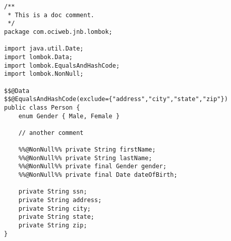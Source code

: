 \begin{lstlisting}[caption= Exemplo de Código em Java, label=src:java]
/**
 * This is a doc comment.
 */
package com.ociweb.jnb.lombok;

import java.util.Date;
import lombok.Data;
import lombok.EqualsAndHashCode;
import lombok.NonNull;

$$@Data
$$@EqualsAndHashCode(exclude={"address","city","state","zip"})
public class Person {
    enum Gender { Male, Female }

    // another comment

    %%@NonNull%% private String firstName;
    %%@NonNull%% private String lastName;
    %%@NonNull%% private final Gender gender;
    %%@NonNull%% private final Date dateOfBirth;

    private String ssn;
    private String address;
    private String city;
    private String state;
    private String zip;
}
\end{lstlisting}
